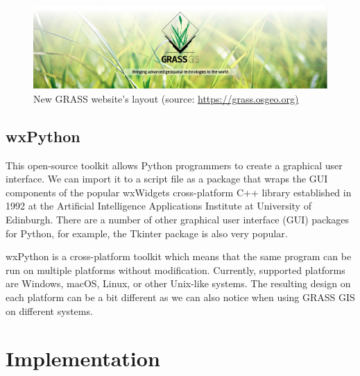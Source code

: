 \documentclass[a4paper,10pt,twoside]{article}
\begin{document}
\vspace{0.3cm}
\begin{figure}[hbt!]
\begin{center}
\includegraphics[width=15cm]{pictures/grass_gis.png} 
\caption[New GRASS website's layout]{New GRASS website's layout (source: \url{https://grass.osgeo.org)}}
\label{fig:grass_gis}
\end{center}
\end{figure}

\subsection{wxPython}
\noindent
\large

\noindent This open-source toolkit allows Python programmers to create a graphical user interface. We can import it to a script file as a package that wraps the GUI components of the popular wxWidgets cross-platform C++ library established in 1992 at the Artificial Intelligence Applications Institute at University of Edinburgh. There are a number of other graphical user interface (GUI) packages for Python, for example, the Tkinter package is also very popular.

wxPython is a cross-platform toolkit which means that the same program can be run on multiple platforms without modification. Currently, supported platforms are Windows, macOS, Linux, or other Unix-like systems. The resulting design on each platform can be a bit different as we can also notice when using GRASS GIS on different systems. 


\newpage
\vspace*{-1cm}
\section{Implementation}
\noindent
\large

\newpage
\vspace*{-1cm}
\end{document}
